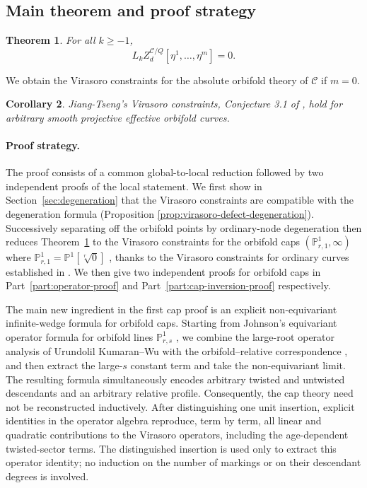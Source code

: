 \documentclass[letterpaper,12pt]{amsart}
\newtheorem{thm}{Theorem}[section]
\newtheorem{cor}[thm]{Corollary}
\theoremstyle{definition}
\newcommand{\PP}{\mathbb P}
\newcommand{\cC}{\mathcal C}
\numberwithin{equation}{section}
\begin{document}
\subsection{Main theorem and proof strategy}

\begin{thm}\label{thm:main}
For all $k\ge -1$,
\begin{equation*}
L_kZ^{\cC/Q}_d[\eta^1,\ldots,\eta^m]=0.
\end{equation*}
\end{thm}
We obtain the Virasoro constraints for the absolute orbifold theory of $\cC$ if $m=0$.

\begin{cor}
Jiang-Tseng's Virasoro constraints, Conjecture 3.1 of \cite{JT}, hold for arbitrary smooth projective effective orbifold curves.
\end{cor}

\paragraph{{\bf Proof strategy.}}
The proof consists of a common global-to-local reduction followed by two independent proofs of the local statement.  We first show in Section~\ref{sec:degeneration} that the Virasoro constraints are compatible with the degeneration formula (Proposition \ref{prop:virasoro-defect-degeneration}). Successively separating off the orbifold points by ordinary-node degeneration then reduces Theorem~\ref{thm:main} to the Virasoro constraints for the orbifold caps $(\PP^1_{r,1},\infty)$ where $\PP^1_{r,1}=\PP^1[\sqrt[r]{0}]$ , thanks to the Virasoro constraints for ordinary curves established in \cite{OP3}. We then give two independent proofs for orbifold caps in Part~\ref{part:operator-proof} and 
Part~\ref{part:cap-inversion-proof} respectively. 

The main new ingredient in the first cap proof is an explicit non-equivariant infinite-wedge formula for orbifold caps.  Starting from Johnson's equivariant operator formula for orbifold lines \(\PP^1_{r,s}\) \cite{J}, we combine the large-root operator analysis of Urundolil Kumaran--Wu \cite{KW23} with the orbifold--relative correspondence \cites{TY,FWY,FWY2}, and then extract the large-$s$ constant term and take the non-equivariant limit.  The resulting formula simultaneously encodes arbitrary twisted and untwisted descendants and an arbitrary relative profile.  Consequently, the cap theory need not be reconstructed inductively.  After distinguishing one unit insertion, explicit identities in the operator algebra reproduce, term by term, all linear and quadratic contributions to the Virasoro operators, including the age-dependent twisted-sector terms.  The distinguished insertion is used only to extract this operator identity; no induction on the number of markings or on their descendant degrees is involved.
\end{document}
